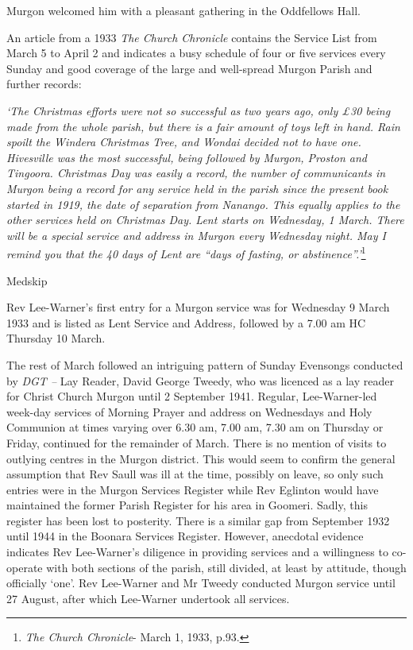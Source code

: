 Murgon welcomed him with a pleasant gathering in the Oddfellows Hall.

An article from a 1933 \emph{The Church Chronicle} contains the Service List from March 5 to April 2 and indicates a busy schedule of four or five services every Sunday and good coverage of the large and well-spread Murgon Parish and further records:

\emph{`The Christmas efforts were not so successful as two years ago, only £30 being made from the whole parish, but there is a fair amount of toys left in hand. Rain spoilt the Windera Christmas Tree, and Wondai decided not to have one. Hivesville was the most successful, being followed by Murgon, Proston and Tingoora. Christmas Day was easily a record, the number of communicants in Murgon being a record for any service held in the parish since the present book started in 1919, the date of separation from Nanango. This equally applies to the other services held on Christmas Day. Lent starts on Wednesday, 1 March. There will be a special service and address in Murgon every Wednesday night. May I remind you that the 40 days of Lent are ``days of fasting, or abstinence''.'}\footnote{\emph{The Church Chronicle}- March 1, 1933, p.93.}

Medskip

Rev Lee-Warner's first entry for a Murgon service was for Wednesday 9 March 1933 and is listed as Lent Service and Address\emph{,} followed by a 7.00 am HC Thursday 10 March.

The rest of March followed an intriguing pattern of Sunday Evensongs conducted by \emph{DGT --} Lay Reader, David George Tweedy, who was licenced as a lay reader for Christ Church Murgon until 2 September 1941. Regular, Lee-Warner-led week-day services of Morning Prayer and address on Wednesdays and Holy Communion at times varying over 6.30 am, 7.00 am, 7.30 am on Thursday or Friday, continued for the remainder of March. There is no mention of visits to outlying centres in the Murgon district. This would seem to confirm the general assumption that Rev Saull was ill at the time, possibly on leave, so only such entries were in the Murgon Services Register while Rev Eglinton would have maintained the former Parish Register for his area in Goomeri. Sadly, this register has been lost to posterity. There is a similar gap from September 1932 until 1944 in the Boonara Services Register. However, anecdotal evidence indicates Rev Lee-Warner's diligence in providing services and a willingness to co-operate with both sections of the parish, still divided, at least by attitude, though officially `one'. Rev Lee-Warner and Mr Tweedy conducted Murgon service until 27 August, after which Lee-Warner undertook all services.


